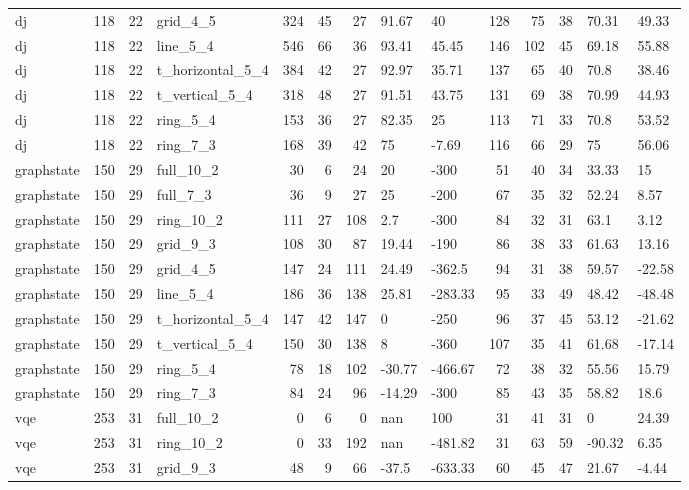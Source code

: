 \begin{longtable}{lrrlrrrllrrrll}
dj & 118 & 22 & grid\_4\_5 & 324 & 45 & 27 & 91.67 & 40 & 128 & 75 & 38 & 70.31 & 49.33 \\
dj & 118 & 22 & line\_5\_4 & 546 & 66 & 36 & 93.41 & 45.45 & 146 & 102 & 45 & 69.18 & 55.88 \\
dj & 118 & 22 & t\_horizontal\_5\_4 & 384 & 42 & 27 & 92.97 & 35.71 & 137 & 65 & 40 & 70.8 & 38.46 \\
dj & 118 & 22 & t\_vertical\_5\_4 & 318 & 48 & 27 & 91.51 & 43.75 & 131 & 69 & 38 & 70.99 & 44.93 \\
dj & 118 & 22 & ring\_5\_4 & 153 & 36 & 27 & 82.35 & 25 & 113 & 71 & 33 & 70.8 & 53.52 \\
dj & 118 & 22 & ring\_7\_3 & 168 & 39 & 42 & 75 & -7.69 & 116 & 66 & 29 & 75 & 56.06 \\
graphstate & 150 & 29 & full\_10\_2 & 30 & 6 & 24 & 20 & -300 & 51 & 40 & 34 & 33.33 & 15 \\
graphstate & 150 & 29 & full\_7\_3 & 36 & 9 & 27 & 25 & -200 & 67 & 35 & 32 & 52.24 & 8.57 \\
graphstate & 150 & 29 & ring\_10\_2 & 111 & 27 & 108 & 2.7 & -300 & 84 & 32 & 31 & 63.1 & 3.12 \\
graphstate & 150 & 29 & grid\_9\_3 & 108 & 30 & 87 & 19.44 & -190 & 86 & 38 & 33 & 61.63 & 13.16 \\
graphstate & 150 & 29 & grid\_4\_5 & 147 & 24 & 111 & 24.49 & -362.5 & 94 & 31 & 38 & 59.57 & -22.58 \\
graphstate & 150 & 29 & line\_5\_4 & 186 & 36 & 138 & 25.81 & -283.33 & 95 & 33 & 49 & 48.42 & -48.48 \\
graphstate & 150 & 29 & t\_horizontal\_5\_4 & 147 & 42 & 147 & 0 & -250 & 96 & 37 & 45 & 53.12 & -21.62 \\
graphstate & 150 & 29 & t\_vertical\_5\_4 & 150 & 30 & 138 & 8 & -360 & 107 & 35 & 41 & 61.68 & -17.14 \\
graphstate & 150 & 29 & ring\_5\_4 & 78 & 18 & 102 & -30.77 & -466.67 & 72 & 38 & 32 & 55.56 & 15.79 \\
graphstate & 150 & 29 & ring\_7\_3 & 84 & 24 & 96 & -14.29 & -300 & 85 & 43 & 35 & 58.82 & 18.6 \\
vqe & 253 & 31 & full\_10\_2 & 0 & 6 & 0 & nan & 100 & 31 & 41 & 31 & 0 & 24.39 \\
vqe & 253 & 31 & ring\_10\_2 & 0 & 33 & 192 & nan & -481.82 & 31 & 63 & 59 & -90.32 & 6.35 \\
vqe & 253 & 31 & grid\_9\_3 & 48 & 9 & 66 & -37.5 & -633.33 & 60 & 45 & 47 & 21.67 & -4.44 \\

\end{longtable}
